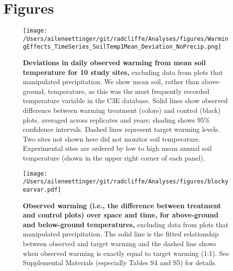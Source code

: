\documentclass{article}
\begin{document}
\section* {Figures}
\clearpage
\begin{figure}[h]
\centering
 \texttt{[image: /Users/aileneettinger/git/radcliffe/Analyses/figures/WarmingEffects\_TimeSeries\_SoilTemp1Mean\_Deviation\_NoPrecip.png]}
 \caption{\textbf{Deviations in daily observed warming from mean soil temperature for 10 study sites,} excluding data from plots that manipulated precipitation. We show mean soil, rather than above-ground, temperature, as this was the most frequently recorded temperature variable in the C3E database. Solid lines show observed difference between warming treatment (colors) and control (black) plots, averaged across replicates and years; shading shows 95\% confidence intervals. Dashed lines represent target warming levels. Two sites not shown here did not monitor soil temperature. Experimental sites are ordered by low to high mean annual soil temperature (shown in the upper right corner of each panel).} %
 \label{fig:effwarm}
 \end{figure}
 \begin{figure}[p]
   \centering
 \texttt{[image: /Users/aileneettinger/git/radcliffe/Analyses/figures/blockyearvar.pdf]}  
 \caption{\textbf{Observed warming (i.e., the difference between treatment and control plots) over space and time, for above-ground and below-ground temperatures,} excluding data from plots that manipulated precipitation. The solid line is the fitted relationship between observed and target warming and the dashed line shows when observed warming is exactly equal to target warming (1:1). See Supplemental Materials (especially Tables S4 and S5) for details.}
 \label{fig:blockyear}
 \end{figure}
 
\end{document}
